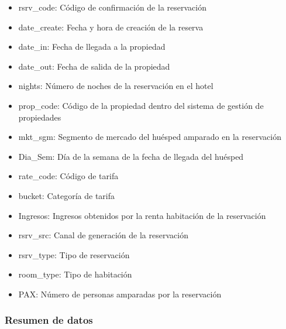 \begin{itemize}
  \item rsrv\_code: Código de confirmación de la reservación
  \item date\_create: Fecha y hora de creación de la reserva
  \item date\_in: Fecha de llegada a la propiedad
  \item date\_out: Fecha de salida de la propiedad
  \item nights: Número de noches de la reservación en el hotel
  \item prop\_code: Código de la propiedad dentro del sistema de gestión de propiedades
  \item mkt\_sgm: Segmento de mercado del huésped amparado en la reservación
  \item Dia\_Sem: Día de la semana de la fecha de llegada del huésped
  \item rate\_code: Código de tarifa
  \item bucket: Categoría de tarifa
  \item Ingresos: Ingresos obtenidos por la renta habitación de la reservación
  \item rsrv\_src: Canal de generación de la reservación
  \item rsrv\_type: Tipo de reservación
  \item room\_type: Tipo de habitación
  \item PAX: Número de personas amparadas por la reservación
\end{itemize}

\subsubsection*{Resumen de datos}

